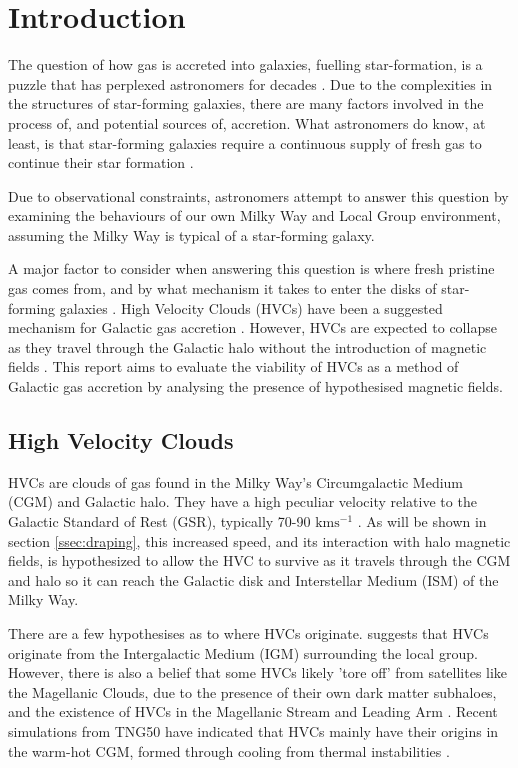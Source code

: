 \chapter{Introduction}
\label{cha:introduction}

The question of how gas is accreted into galaxies, fuelling star-formation, is a puzzle that has perplexed astronomers for decades \citep{ID28,ID23}. Due to the complexities in the structures of star-forming galaxies, there are many factors involved in the process of, and potential sources of, accretion. What astronomers do know, at least, is that star-forming galaxies require a continuous supply of fresh gas to continue their star formation \citep{ID28,ID23, ID19}.


Due to observational constraints, astronomers attempt to answer this question by examining the behaviours of our own Milky Way and Local Group environment, assuming the Milky Way is typical of a star-forming galaxy.


A major factor to consider when answering this question is where fresh pristine gas comes from, and by what mechanism it takes to enter the disks of star-forming galaxies \citep{ID8, ID28, ID49}. High Velocity Clouds (HVCs) have been a suggested mechanism for Galactic gas accretion \citep{ID3,ID19}. However, HVCs are expected to collapse as they travel through the Galactic halo without the introduction of magnetic fields \citep{ID10, ID11, ID13, ID23, ID24, ID34, ID51}. This report aims to evaluate the viability of HVCs as a method of Galactic gas accretion by analysing the presence of hypothesised magnetic fields.


\section{High Velocity Clouds}
\label{sec:hvcs}

HVCs are clouds of gas found in the Milky Way's Circumgalactic Medium (CGM) and Galactic halo. They have a high peculiar velocity relative to the Galactic Standard of Rest (GSR), typically 70-90 $\mathrm{km s^{-1}}$ \citep{ID7, ID8}. As will be shown in section \ref{ssec:draping}, this increased speed, and its interaction with halo magnetic fields, is hypothesized to allow the HVC to survive as it travels through the CGM and halo so it can reach the Galactic disk and Interstellar Medium (ISM) of the Milky Way.


There are a few hypothesises as to where HVCs originate. \cite{ID19} suggests that HVCs originate from the Intergalactic Medium (IGM) surrounding the local group. However, there is also a belief that some HVCs likely 'tore off' from satellites like the Magellanic Clouds, due to the presence of their own dark matter subhaloes, and the existence of HVCs in the Magellanic Stream and Leading Arm \citep{ID27, ID2}. Recent simulations from TNG50 have indicated that HVCs mainly have their origins in the warm-hot CGM, formed through cooling from thermal instabilities \citep{ID74}.


